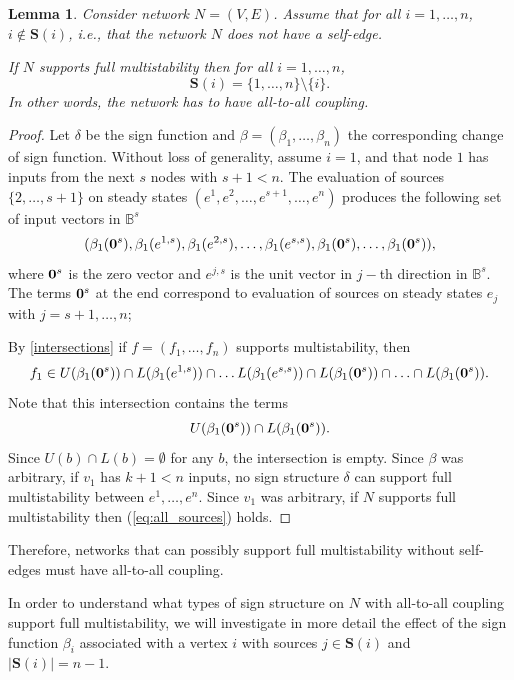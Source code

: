 \documentclass[12pt]{amsart}
\newcommand{\bzero}{{\bf 0}}
\newcommand{\bbB}{\mathbb{B}}
\newcommand{\Sources}{\mathbf{S}}
\newtheorem{lem}[thm]{Lemma}
\theoremstyle{definition}
\begin{document}
\begin{lem}\label{lem:all_edges}
    Consider network $N=(V,E)$. Assume that for all $i=1, \ldots, n$, $i \not \in \Sources(i)$, i.e., that the network $N$ does not have a self-edge.
     
    If $N$ supports full multistability then for all $i=1, \ldots, n$, 
    \begin{equation} \label{eq:all_sources} \Sources(i) = \{1, \ldots, n\}\setminus \{i\}.
    \end{equation}
    In other words, the network has to have all-to-all coupling. 
\end{lem}
\begin{proof}
Let $\delta$ be the sign function and $\beta=(\beta_1,\ldots, \beta_n)$ the corresponding change of sign function. 
Without loss of generality, assume $i=1$, and that node $1$ has inputs from the next $s$ nodes with $s+1<n$. 
The evaluation of sources $\{2, \ldots, {s+1}\}$ on steady states 
$(e^1, e^2, \ldots, e^{s+1}, \ldots, e^n)$ produces the following set of input vectors in $\bbB^{s}$
\[ (\beta_1(\bzero^s),\beta_1(e^{1,s}), \beta_1(e^{2,s}), \ldots, \beta_1(e^{s,s}),\beta_{1}(\bzero^s),\ldots, \beta_1(\bzero^s)),\]
where $\bzero^s$ is the zero vector and $e^{j,s}$ is the unit vector in $j-$th direction in $\bbB^{s}$. The terms $\bzero^s$ at the end correspond to evaluation of sources on steady states $e_j$ with $j=s+1, \ldots, n$;

By \cref{intersections} if $f=(f_1,\ldots, f_n)$ supports multistability, then 
\[
f_1 \in U(\beta_1(\bzero^s)) \cap L(\beta_1(e^{1,s})) \cap \ldots L(\beta_1(e^{s,s})) \cap L(\beta_1(\bzero^s))\cap \ldots \cap L(\beta_1(\bzero^s)).
\]
Note that this intersection contains the terms
\[ U(\beta_1(\bzero^s)) \cap L(\beta_1(\bzero^s)). \]
Since $U(b) \cap L(b) = \emptyset$ for any $b$, the intersection is empty. Since $\beta$ was arbitrary, if $v_1$ has $k+1<n$ inputs, no sign structure $\delta$ can support full multistability between $e^1,\ldots, e^n$. Since $v_1$ was arbitrary, if $N$ supports full multistability then (\ref{eq:all_sources}) holds.
\end{proof}

Therefore, networks that can possibly support full multistability without self-edges must have all-to-all coupling. 

In order to understand what types of sign structure on $N$ with all-to-all coupling support full multistability, we will investigate in more detail the effect of the sign function $\beta_i$ associated with a vertex $i$ with sources $j \in \Sources(i)$ and 
 $|\Sources(i)|=n-1$.
\end{document}
